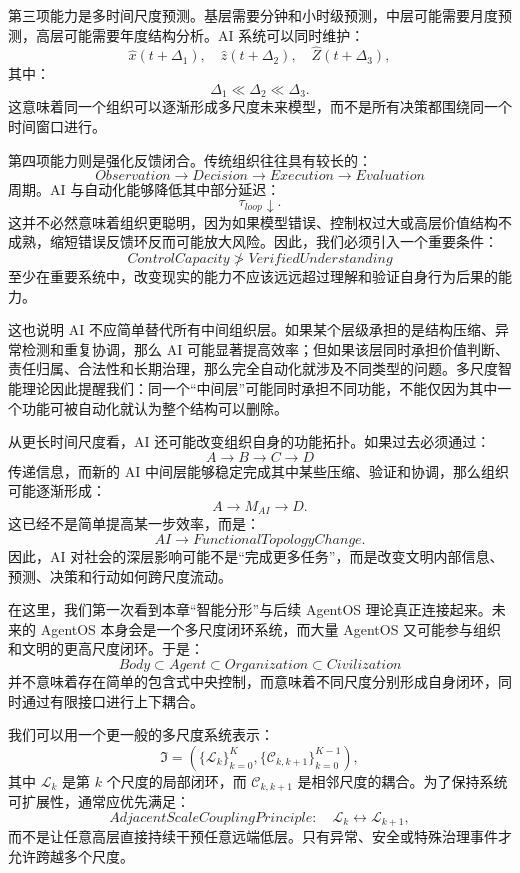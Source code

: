 第三项能力是多时间尺度预测。基层需要分钟和小时级预测，中层可能需要月度预测，高层可能需要年度结构分析。AI 系统可以同时维护：
\[
\hat x(t+\Delta_1),
\quad
\hat z(t+\Delta_2),
\quad
\hat Z(t+\Delta_3),
\]
其中：
\[
\Delta_1
\ll
\Delta_2
\ll
\Delta_3.
\]
这意味着同一个组织可以逐渐形成多尺度未来模型，而不是所有决策都围绕同一个时间窗口进行。

第四项能力则是强化反馈闭合。传统组织往往具有较长的：
\[
Observation
\rightarrow
Decision
\rightarrow
Execution
\rightarrow
Evaluation
\]
周期。AI 与自动化能够降低其中部分延迟：
\[
\tau_{loop}\downarrow.
\]
这并不必然意味着组织更聪明，因为如果模型错误、控制权过大或高层价值结构不成熟，缩短错误反馈环反而可能放大风险。因此，我们必须引入一个重要条件：
\[
\boxed{
ControlCapacity
\not>
VerifiedUnderstanding
}
\]
至少在重要系统中，改变现实的能力不应该远远超过理解和验证自身行为后果的能力。

这也说明 AI 不应简单替代所有中间组织层。如果某个层级承担的是结构压缩、异常检测和重复协调，那么 AI 可能显著提高效率；但如果该层同时承担价值判断、责任归属、合法性和长期治理，那么完全自动化就涉及不同类型的问题。多尺度智能理论因此提醒我们：同一个“中间层”可能同时承担不同功能，不能仅因为其中一个功能可被自动化就认为整个结构可以删除。

从更长时间尺度看，AI 还可能改变组织自身的功能拓扑。如果过去必须通过：
\[
A\rightarrow B\rightarrow C\rightarrow D
\]
传递信息，而新的 AI 中间层能够稳定完成其中某些压缩、验证和协调，那么组织可能逐渐形成：
\[
A\rightarrow M_{AI}\rightarrow D.
\]
这已经不是简单提高某一步效率，而是：
\[
\boxed{
AI
\rightarrow
FunctionalTopologyChange.
}
\]
因此，AI 对社会的深层影响可能不是“完成更多任务”，而是改变文明内部信息、预测、决策和行动如何跨尺度流动。

在这里，我们第一次看到本章“智能分形”与后续 AgentOS 理论真正连接起来。未来的 AgentOS 本身会是一个多尺度闭环系统，而大量 AgentOS 又可能参与组织和文明的更高尺度闭环。于是：
\[
Body
\subset
Agent
\subset
Organization
\subset
Civilization
\]
并不意味着存在简单的包含式中央控制，而意味着不同尺度分别形成自身闭环，同时通过有限接口进行上下耦合。

我们可以用一个更一般的多尺度系统表示：
\[
\mathfrak{I}
=
\left(
\{\mathcal L_k\}_{k=0}^{K},
\{\mathcal C_{k,k+1}\}_{k=0}^{K-1}
\right),
\]
其中 $\mathcal L_k$ 是第 $k$ 个尺度的局部闭环，而 $\mathcal C_{k,k+1}$ 是相邻尺度的耦合。为了保持系统可扩展性，通常应优先满足：
\[
\boxed{
AdjacentScaleCouplingPrinciple:
\quad
\mathcal L_k
\leftrightarrow
\mathcal L_{k+1},
}
\]
而不是让任意高层直接持续干预任意远端低层。只有异常、安全或特殊治理事件才允许跨越多个尺度。

